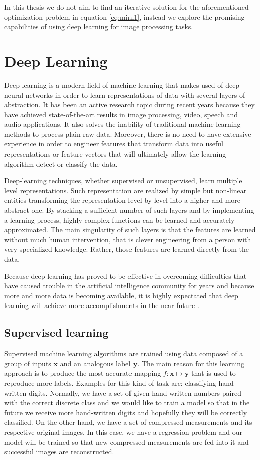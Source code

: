 In this thesis we do not aim to find an iterative solution for the aforementioned optimization problem in equation \ref{eq:minl1}, instead we explore the promising capabilities of using deep learning for image processing tasks.

\section{Deep Learning}
Deep learning is a modern field of machine learning that makes used of deep neural networks in order to learn representations of data with several layers of abstraction. It has been an active research topic during recent years because they have achieved state-of-the-art results in image processing, video, speech and audio applications. It also solves the inability of traditional machine-learning methods to process plain raw data. Moreover, there is no need to have extensive experience in order to engineer features that transform data into useful representations or feature vectors that will ultimately allow the learning algorithm detect or classify the data. \

Deep-learning techniques, whether supervised or unsupervised, learn multiple level representations. Such representation are realized by simple but non-linear entities transforming the representation level by level into a higher and more abstract one. By stacking a sufficient number of such layers and by implementing a learning process, highly complex functions can be learned and accurately approximated. The main singularity of such layers is that the features are learned without much human intervention, that is clever engineering from a person with very specialized knowledge. Rather, those features are learned directly from the data.   \   

Because deep learning has proved to be effective in overcoming difficulties that have caused trouble in the artificial intelligence community for years and because more and more data is becoming available, it is highly expectated that deep learning will achieve more accomplishments in the near future \cite{lecun2015deep}.  

\subsection{Supervised learning} \label{sec:superv}
Supervised machine learning algorithms are trained using data composed of a group of inputs $\mathbf{x}$ and an analogous label $\mathbf{y}$. The main reason for this learning approach is to produce the most accurate mapping $f : \mathbf{x} \mapsto \mathbf{y} $ that is used to reproduce more labels. Examples for this kind of task are: classifying hand-written digits. Normally, we have a set of given hand-written numbers paired with the correct discrete class and we would like to train a model so that in the future we receive more hand-written digits and hopefully they will be correctly classified. On the other hand, we have a set of compressed measurements and its respective original images. In this case, we have a regression problem and our model will be trained so that new compressed measurements are fed into it and successful images are reconstructed.   

